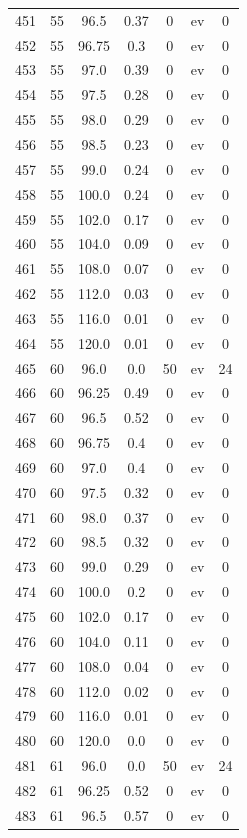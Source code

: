 \documentclass[12pt,a4paper]{article}
\begin{document}
\begin{tabular}{r|cccccc}
	451 & 55 & 96.5 & 0.37 & 0 & ev & 0 \\
	452 & 55 & 96.75 & 0.3 & 0 & ev & 0 \\
	453 & 55 & 97.0 & 0.39 & 0 & ev & 0 \\
	454 & 55 & 97.5 & 0.28 & 0 & ev & 0 \\
	455 & 55 & 98.0 & 0.29 & 0 & ev & 0 \\
	456 & 55 & 98.5 & 0.23 & 0 & ev & 0 \\
	457 & 55 & 99.0 & 0.24 & 0 & ev & 0 \\
	458 & 55 & 100.0 & 0.24 & 0 & ev & 0 \\
	459 & 55 & 102.0 & 0.17 & 0 & ev & 0 \\
	460 & 55 & 104.0 & 0.09 & 0 & ev & 0 \\
	461 & 55 & 108.0 & 0.07 & 0 & ev & 0 \\
	462 & 55 & 112.0 & 0.03 & 0 & ev & 0 \\
	463 & 55 & 116.0 & 0.01 & 0 & ev & 0 \\
	464 & 55 & 120.0 & 0.01 & 0 & ev & 0 \\
	465 & 60 & 96.0 & 0.0 & 50 & ev & 24 \\
	466 & 60 & 96.25 & 0.49 & 0 & ev & 0 \\
	467 & 60 & 96.5 & 0.52 & 0 & ev & 0 \\
	468 & 60 & 96.75 & 0.4 & 0 & ev & 0 \\
	469 & 60 & 97.0 & 0.4 & 0 & ev & 0 \\
	470 & 60 & 97.5 & 0.32 & 0 & ev & 0 \\
	471 & 60 & 98.0 & 0.37 & 0 & ev & 0 \\
	472 & 60 & 98.5 & 0.32 & 0 & ev & 0 \\
	473 & 60 & 99.0 & 0.29 & 0 & ev & 0 \\
	474 & 60 & 100.0 & 0.2 & 0 & ev & 0 \\
	475 & 60 & 102.0 & 0.17 & 0 & ev & 0 \\
	476 & 60 & 104.0 & 0.11 & 0 & ev & 0 \\
	477 & 60 & 108.0 & 0.04 & 0 & ev & 0 \\
	478 & 60 & 112.0 & 0.02 & 0 & ev & 0 \\
	479 & 60 & 116.0 & 0.01 & 0 & ev & 0 \\
	480 & 60 & 120.0 & 0.0 & 0 & ev & 0 \\
	481 & 61 & 96.0 & 0.0 & 50 & ev & 24 \\
	482 & 61 & 96.25 & 0.52 & 0 & ev & 0 \\
	483 & 61 & 96.5 & 0.57 & 0 & ev & 0 \\

\end{tabular}
\end{document}
